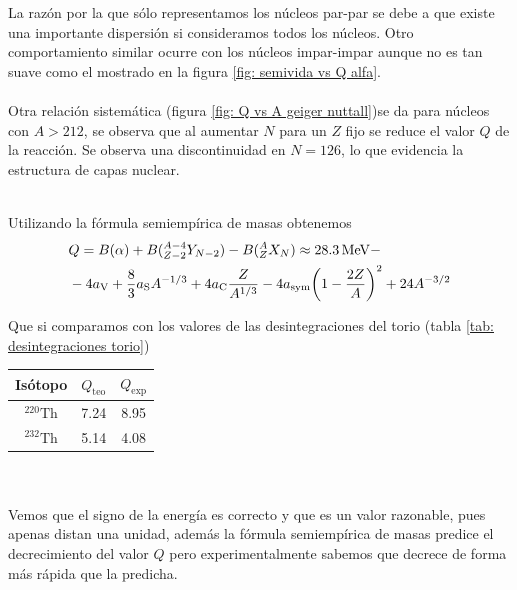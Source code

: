 La razón por la que sólo representamos los núcleos par-par se debe a que existe una importante dispersión si consideramos todos los núcleos. Otro comportamiento similar ocurre con los núcleos impar-impar aunque no es tan suave como el mostrado en la figura \ref{fig: semivida vs Q alfa}.\\\\
Otra relación sistemática (figura \ref{fig: Q vs A geiger nuttall})se da para núcleos con $A>212$, se observa que al aumentar $N$ para un $Z$ fijo se reduce el valor $Q$ de la reacción. Se observa una discontinuidad en $N=126$, lo que evidencia la estructura de capas nuclear.\\\\
\noindent
\begin{minipage}{0.6\textwidth}
    Utilizando la fórmula semiempírica de masas obtenemos $$\begin{aligned}
    &Q=B(\alpha)+B({}^{A-4} _{Z-2} Y_{N-2})-B( ^A _Z X_N)\approx \unit[28.3]{MeV} -\\&-4a_\mathrm{V}+\frac{8}{3}a_\mathrm{S}A^{-1/3}+4a_\mathrm{C}\frac{Z}{A^{1/3}}-4a_\mathrm{sym} \qty(1-\frac{2Z}{A})^2+24A^{-3/2}
\end{aligned}$$

Que si comparamos con los valores de las desintegraciones del torio (tabla \ref{tab: desintegraciones torio})
\end{minipage}
\hfill
\begin{minipage}{0.35\textwidth}
    \centering
\begin{tabular}{|ccc|}
\hline
Isótopo             & $Q_\mathrm{teo}$ & $Q_\mathrm{exp}$ \\
\hline\hline
$^{220}\mathrm{Th}$ & 7.24                         & 8.95                         \\
$^{232}\mathrm{Th}$ & 5.14                         & 4.08   \\             \hline
\end{tabular}
\label{tab: desintegraciones torio}
\end{minipage}
\\\\
Vemos que el signo de la energía es correcto y que es un valor razonable, pues apenas distan una unidad, además la fórmula semiempírica de masas predice el decrecimiento del valor $Q$ pero experimentalmente sabemos que decrece de forma más rápida que la predicha.
\newpage
\noindent
